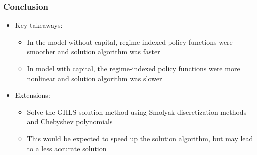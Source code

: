\documentclass[11pt]{beamer}
\begin{document}
\begin{frame}\frametitle{Conclusion}
\begin{itemize}\setlength{\itemsep}{10pt}
\item <1-|handout:1>Key takeaways:
\begin{itemize}\setlength{\itemsep}{4pt}
\item In the model without capital, regime-indexed policy functions were smoother and solution algorithm was faster
\item In model with capital,  the regime-indexed policy functions were more nonlinear and solution algorithm was slower
\end{itemize}
\item <2-|handout:1>Extensions:
\begin{itemize}\setlength{\itemsep}{4pt}
\item Solve the GHLS solution method using Smolyak discretization methods and Chebyshev polynomials 
\item This would be expected to speed up the solution algorithm, but may lead to a less accurate solution
\end{itemize}
\end{itemize}
\end{frame}
\end{document}
